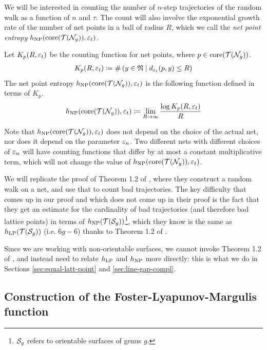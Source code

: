 \documentclass[12pt, reqno]{amsart}
\begin{document}
We will be interested in counting the number of $n$-step trajectories of the random walk as a function of $n$ and $\tau$.
The count will also involve the exponential growth rate of the number of net points in a ball of radius $R$, which we call the \emph{net point entropy} $h_{\mathrm{NP}}(\mathrm{core}(\mathcal{T}(\mathcal{N}_g)), \varepsilon_t)$.

\begin{definition}
  Let $K_p(R, \varepsilon_t)$ be the counting function for net points, where $p \in \mathrm{core}(\mathcal{T}(\mathcal{N}_g))$.
  \begin{align*}
    K_p(R, \varepsilon_t) \coloneqq \#\left( y \in \mathfrak{N} \mid d_{\varepsilon_t}(p, y) \leq R \right)
  \end{align*}
  The net point entropy $h_{\mathrm{NP}}(\mathrm{core}(\mathcal{T}(\mathcal{N}_g)), \varepsilon_t)$ is the following function defined in terms of $K_p$.
  \begin{align*}
    h_{\mathrm{NP}}(\mathrm{core}(\mathcal{T}(\mathcal{N}_g)), \varepsilon_t) \coloneqq \lim_{R \to \infty} \frac{\log K_p(R, \varepsilon_t)}{R}
  \end{align*}
\end{definition}

Note that $h_{\mathrm{NP}}(\mathrm{core}(\mathcal{T}(\mathcal{N}_g)), \varepsilon_t)$ does not depend on the choice of the actual net, nor does it depend on the parameter $\varepsilon_n$. Two different nets with different choices of $\varepsilon_n$ will have counting functions that differ by at most a constant multiplicative term, which will not change the value of $h_{\mathrm{NP}}(\mathrm{core}(\mathcal{T}(\mathcal{N}_g)), \varepsilon_t)$.

We will replicate the proof of Theorem 1.2 of \textcite{eskinmirzakhani}, where they construct a random walk on a net, and use that to count bad trajectories.
The key difficulty that comes up in our proof and which does not come up in their proof is the fact that they get an estimate for the cardinality of bad trajectories (and therefore bad lattice points) in terms of $h_{\mathrm{NP}}(\mathcal{T}(\mathcal{S}_g))$\footnote{$\mathcal{S}_g$ refers to orientable surfaces of genus $g$.}, which they know is the same as $h_{\mathrm{LP}}(\mathcal{T}(\mathcal{S}_g))$ (i.e. $6g-6$) thanks to Theorem 1.2 of \textcite{10.1215/00127094-1548443}.

Since we are working with non-orientable surfaces, we cannot invoke Theorem 1.2 of \textcite{10.1215/00127094-1548443}, and instead need to relate $h_{\mathrm{LP}}$ and $h_{\mathrm{NP}}$ more directly: this is what we do in Sections \ref{sec:equal-latt-point} and \ref{sec:line-gap-compl}.

\subsection{Construction of the Foster-Lyapunov-Margulis function}
\label{sec:constr-marg-funct}
\end{document}
